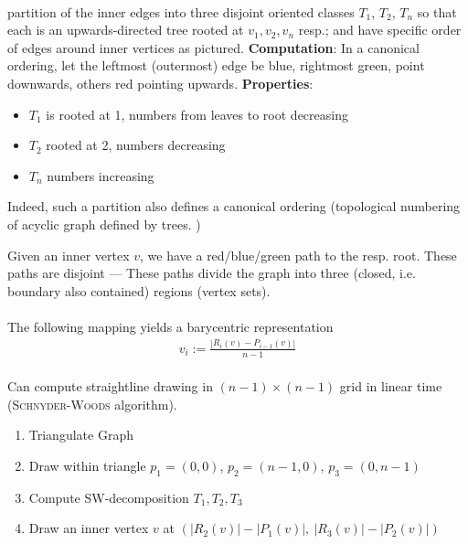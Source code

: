 \documentclass[10pt,twocolumn]{article}
\begin{document}
\paragraph{} partition of the inner edges into three
disjoint oriented classes $T_1$, $T_2$, $T_n$ so that each is an
upwards-directed tree rooted at $v_1, v_2, v_n$ resp.; and have specific order
of edges around inner vertices as pictured. \textbf{Computation}: In a canonical
ordering, let the leftmost (outermost) edge be blue, rightmost green, point
downwards, others red pointing upwards. \textbf{Properties}:
\begin{itemize}
\item $T_1$ is rooted at 1, numbers from leaves to root decreasing
\item $T_2$ rooted at 2, numbers decreasing
\item $T_n$ numbers increasing
\end{itemize}
Indeed, such a partition also defines a canonical ordering (topological
numbering of acyclic graph defined by trees. )


Given an inner vertex $v$, we have a red/blue/green path to the resp. root.
These paths are disjoint  --- These paths divide the graph
into three (closed, i.e. boundary also contained) regions (vertex sets).


\paragraph{} The following mapping yields a barycentric representation
\begin{align*}
v_i := \frac{ |R_i(v) - P_{i-1}(v)|}{n-1}
\end{align*}


\paragraph{} Can compute straightline drawing in $(n-1) \times (n-1)$
grid in linear time (\textsc{Schnyder-Woods} algorithm).


\begin{enumerate}
\item Triangulate Graph
\item Draw within triangle $p_1=(0,0)$, $p_2=(n-1, 0)$, $p_3=(0, n-1)$
\item Compute SW-decomposition $T_1, T_2, T_3$
\item Draw an inner vertex $v$ at $(|R_2(v)| - |P_1(v)|,~ |R_3(v)| - |P_2(v)|)$
\end{enumerate}
\end{document}
